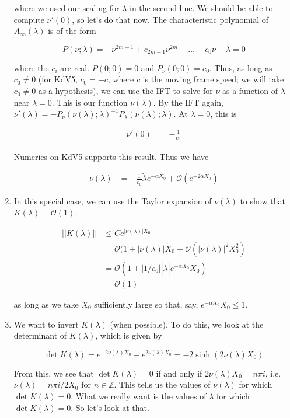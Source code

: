 \documentclass[12pt]{article}
\def\Z{{\mathbb Z}}
\begin{document}
\begin{enumerate}
where we used our scaling for $\lambda$ in the second line. We should be able to compute $\nu'(0)$, so let's do that now. The characteristic polynomial of $A_\infty(\lambda)$ is of the form

\[
P(\nu; \lambda) = 
-\nu^{2m+1} + c_{2m - 1} \nu^{2m} + \dots + c_0 \nu + \lambda = 0
\]

where the $c_i$ are real. $P(0; 0) = 0$ and $P_\nu(0; 0) = c_0$. Thus, as long as $c_0 \neq 0$ (for KdV5, $c_0 = -c$, where $c$ is the moving frame speed; we will take $c_0 \neq 0$ as a hypothesis), we can use the IFT to solve for $\nu$ as a function of $\lambda$ near $\lambda = 0$. This is our function $\nu(\lambda)$. By the IFT again, $\nu'(\lambda) = -P_\nu(\nu(\lambda); \lambda)^{-1} P_\lambda(\nu(\lambda); \lambda)$. At $\lambda = 0$, this is

\begin{align*}
\nu'(0) &= -\frac{1}{c_0}
\end{align*}

Numerics on KdV5 supports this result. Thus we have

\begin{align*}
\nu(\lambda) &= -\frac{1}{c_0}\tilde{\lambda}e^{-\alpha X_0} + \mathcal{O}(e^{-2 \alpha X_0})
\end{align*}

\item In this special case, we can use the Taylor expansion of $\nu(\lambda)$ to show that $K(\lambda) = \mathcal{O}(1)$.

\begin{align*}
||K(\lambda)|| &\leq C e^{|\nu(\lambda)|X_0} \\
 &= \mathcal{O} (1 + |\nu(\lambda)|X_0 + \mathcal{O}(|\nu(\lambda)|^2 X_0^2) \\
&= \mathcal{O}( 1 + |1/c_0| |\tilde{\lambda} | e^{-\alpha X_0} X_0 ) \\
&= \mathcal{O}(1)
\end{align*}

as long as we take $X_0$ sufficiently large so that, say, $e^{-\alpha X_0} X_0 \leq 1$.

\item We want to invert $K(\lambda)$ (when possible). To do this, we look at the determinant of $K(\lambda)$, which is given by

\[
\det K(\lambda) = e^{-2 \nu(\lambda)X_0} - e^{2 \nu(\lambda)X_0} = -2 \sinh(2 \nu(\lambda) X_0)
\]

From this, we see that $\det K(\lambda) = 0$ if and only if $2 \nu(\lambda)X_0 = n \pi i$, i.e. $\nu(\lambda) = n \pi i / 2 X_0$ for $n \in \Z$. This tells us the values of $\nu(\lambda)$ for which $\det K(\lambda) = 0$. What we really want is the values of $\lambda$ for which $\det K(\lambda) = 0$. So let's look at that.\\


\end{enumerate}
\end{document}
